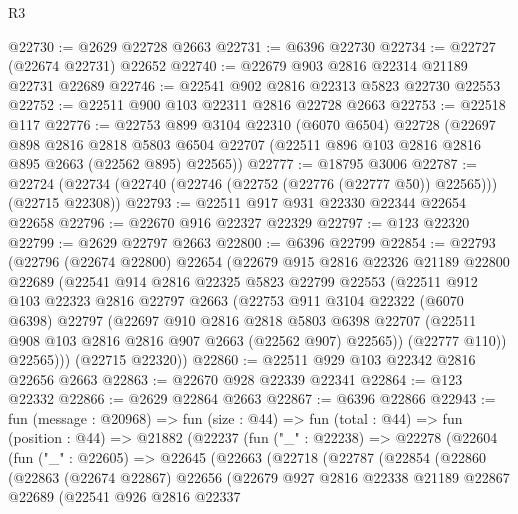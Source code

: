 \begin{lexlean}{R3}
\begin{coremodule}
@22730 := @2629 @22728 @2663
@22731 := @6396 @22730
@22734 := @22727 (@22674 @22731) @22652
@22740 := @22679 @903 @2816 @22314 @21189 @22731 @22689
@22746 := @22541 @902 @2816 @22313 @5823 @22730 @22553
@22752 := @22511 @900 @103 @22311 @2816 @22728 @2663
@22753 := @22518 @117
@22776 := @22753
    @899
    @3104
    @22310
    (@6070 @6504)
    @22728
    (@22697
      @898
      @2816
      @2818
      @5803
      @6504
      @22707
      (@22511 @896 @103 @2816 @2816 @895 @2663 (@22562 @895) @22565))
@22777 := @18795 @3006
@22787 := @22724 (@22734 (@22740 (@22746 (@22752 (@22776 (@22777 @50)) @22565))) (@22715 @22308))
@22793 := @22511 @917 @931 @22330 @22344 @22654 @22658
@22796 := @22670 @916 @22327 @22329
@22797 := @123 @22320
@22799 := @2629 @22797 @2663
@22800 := @6396 @22799
@22854 := @22793
    (@22796
      (@22674 @22800)
      @22654
      (@22679
        @915
        @2816
        @22326
        @21189
        @22800
        @22689
        (@22541
          @914
          @2816
          @22325
          @5823
          @22799
          @22553
          (@22511
            @912
            @103
            @22323
            @2816
            @22797
            @2663
            (@22753
              @911
              @3104
              @22322
              (@6070 @6398)
              @22797
              (@22697
                @910
                @2816
                @2818
                @5803
                @6398
                @22707
                (@22511 @908 @103 @2816 @2816 @907 @2663 (@22562 @907) @22565))
              (@22777 @110))
            @22565)))
      (@22715 @22320))
@22860 := @22511 @929 @103 @22342 @2816 @22656 @2663
@22863 := @22670 @928 @22339 @22341
@22864 := @123 @22332
@22866 := @2629 @22864 @2663
@22867 := @6396 @22866
@22943 := fun (message : @20968) =>
  fun (size : @44) =>
  fun (total : @44) =>
  fun (position : @44) =>
  @21882
    (@22237
      (fun ("_" : @22238) =>
      @22278
        (@22604
          (fun ("_" : @22605) =>
          @22645
            (@22663
              (@22718
                (@22787
                  (@22854
                    (@22860
                      (@22863
                        (@22674 @22867)
                        @22656
                        (@22679
                          @927
                          @2816
                          @22338
                          @21189
                          @22867
                          @22689
                          (@22541
                            @926
                            @2816
                            @22337

\end{coremodule}
\end{lexlean}
